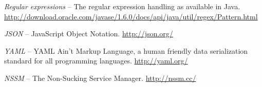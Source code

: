 \begin{thebibliography}{999}
		\textit{Regular expressions} -- The regular expression handling as available
		in Java.
		\url{http://download.oracle.com/javase/1.6.0/docs/api/java/util/regex/Pattern.html}{}

		\textit{JSON} -- JavaScript Object Notation.
		\url{http://json.org/}{}

		\textit{YAML} -- YAML Ain't Markup Language, a human friendly
		data serialization standard for all programming languages.
		\url{http://yaml.org/}{}

		\textit{NSSM} -- The Non-Sucking Service Manager.
		\url{http://nssm.cc/}{}

\end{thebibliography}
